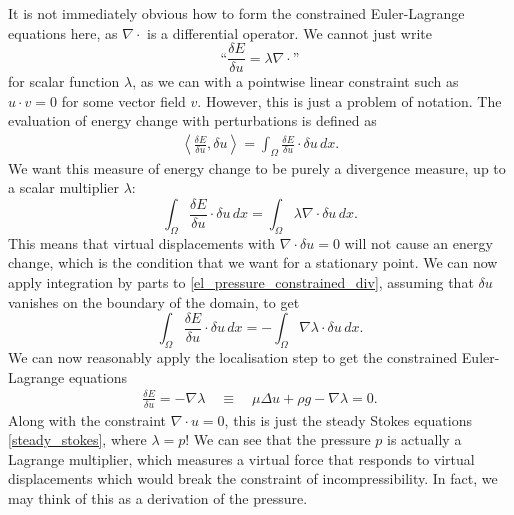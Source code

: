 \documentclass[11pt,a4paper]{memoir}
\newcommand{\inner}[1]{\left<#1\right>}
\newcommand{\om}{{\Omega}}
\begin{document}
It is not immediately obvious how to form the constrained Euler-Lagrange equations here, as $\nabla\cdot$ is a differential operator.
We cannot just write
    $$\text{``}\frac{\delta E}{\delta u} = \lambda\nabla\cdot\text{''}$$
for scalar function $\lambda$, as we can with a pointwise linear constraint such as $u\cdot v = 0$ for some vector field $v$. However, this is just a problem of
notation. The evaluation of energy change with perturbations is defined as
\begin{align*}
    \inner{\frac{\delta E}{\delta u}, \delta u} = \int_\Omega \frac{\delta E}{\delta u}\cdot\delta u\,dx.
\end{align*}
We want this measure of energy change to be purely a divergence measure, up to a scalar multiplier $\lambda$:
\begin{equation}\label{el_pressure_constrained_div}
    \int_\Omega \frac{\delta E}{\delta u}\cdot\delta u\,dx = \int_\om \lambda \nabla\cdot \delta u\,dx.
\end{equation}
This means
that virtual displacements with $\nabla\cdot\delta u = 0$ will not cause an energy change, which is the condition that
we want for a stationary point.
We can now apply integration by parts to \eqref{el_pressure_constrained_div}, assuming that $\delta u$ vanishes on the boundary of the domain, to get
\begin{equation}
    \int_\Omega \frac{\delta E}{\delta u}\cdot\delta u\,dx = -\int_\om \nabla\lambda \cdot \delta u\,dx.
\end{equation}
We can now reasonably apply the localisation step to get the constrained Euler-Lagrange equations
\begin{equation}
\begin{split}
           \frac{\delta E}{\delta u} = -\nabla \lambda
    \quad\equiv\quad \mu\Delta u + \rho g - \nabla \lambda = 0.
\end{split}
\end{equation}
Along with the constraint $\nabla\cdot u = 0$, this is just the steady Stokes equations \eqref{steady_stokes}, where $\lambda = p$! We can see that the pressure $p$
is actually
a Lagrange multiplier, which measures a virtual force that responds to virtual displacements which would break the constraint of incompressibility.
In fact, we may think of this as a derivation of the pressure.
\end{document}
